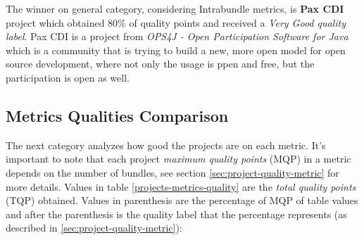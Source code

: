 The winner on general category, considering Intrabundle metrics, is \textbf{Pax CDI} project which obtained 80\% of quality points and received a \emph{Very Good quality label}. Pax CDI is a project from \emph{OPS4J - Open Participation Software for Java} which is a community that is trying to build a new, more open model for open source development, where not only the usage is ppen and free, but the participation is open as well. 

\subsection{Metrics Qualities Comparison}

The next category analyzes how good the projects are on each metric. It's important to note that each project \emph{maximum quality points} (MQP) in a metric depends on the number of bundles, see section \ref{sec:project-quality-metric} for more details. Values in table \ref{projects-metrics-quality} are the \emph{total quality points} (TQP) obtained. Values in parenthesis are the percentage of MQP of table values and after the parenthesis is the quality label that the percentage represents (as described in \ref{sec:project-quality-metric}):  

